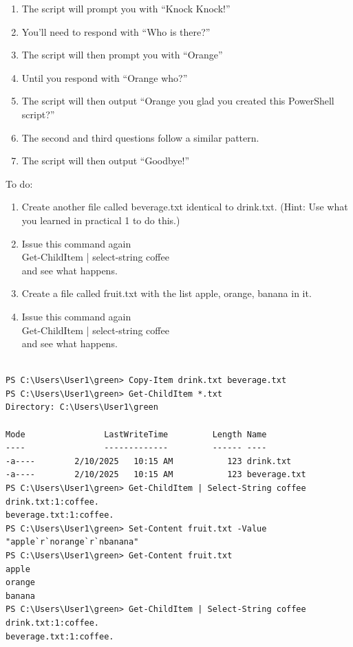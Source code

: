 \documentclass[a4paper]{article}
\begin{document}
\begin{enumerate}
    \item The script will prompt you with “Knock Knock!”
    \item You’ll need to respond with “Who is there?”
    \item The script will then prompt you with “Orange”
    \item Until you respond with “Orange who?”
    \item The script will then output “Orange you glad you created this PowerShell script?”
    \item The second and third questions follow a similar pattern.
    \item The script will then output “Goodbye!”
\end{enumerate}
\textcolor{green!50!black}{
To do:
\begin{enumerate}
    \item Create another file called beverage.txt identical to drink.txt.
    (Hint: Use what you learned in practical 1 to do this.)
    \item Issue this command again\\
    Get-ChildItem | select-string coffee\\
    and see what happens.
    \item Create a file called fruit.txt with the list apple, orange, banana in it.
    \item Issue this command again\\
    Get-ChildItem | select-string coffee\\
    and see what happens.
\end{enumerate}
}
\begin{verbatim}

PS C:\Users\User1\green> Copy-Item drink.txt beverage.txt
PS C:\Users\User1\green> Get-ChildItem *.txt
Directory: C:\Users\User1\green

Mode                LastWriteTime         Length Name
----                -------------         ------ ----
-a----        2/10/2025   10:15 AM           123 drink.txt
-a----        2/10/2025   10:15 AM           123 beverage.txt
PS C:\Users\User1\green> Get-ChildItem | Select-String coffee
drink.txt:1:coffee.
beverage.txt:1:coffee.
PS C:\Users\User1\green> Set-Content fruit.txt -Value "apple`r`norange`r`nbanana"
PS C:\Users\User1\green> Get-Content fruit.txt
apple
orange
banana
PS C:\Users\User1\green> Get-ChildItem | Select-String coffee
drink.txt:1:coffee.
beverage.txt:1:coffee.
\end{verbatim}
\end{document}
